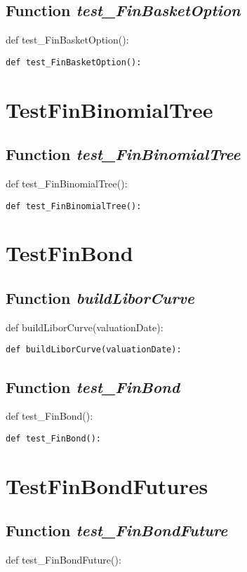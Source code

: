 \documentclass[twoside,11pt]{book}
\begin{document}
\subsection{Function {\it test\_FinBasketOption}}
def test\_FinBasketOption():

\begin{lstlisting}
def test_FinBasketOption():
\end{lstlisting}


\newpage
\section{TestFinBinomialTree}

\subsection{Function {\it test\_FinBinomialTree}}
def test\_FinBinomialTree():

\begin{lstlisting}
def test_FinBinomialTree():
\end{lstlisting}


\newpage
\section{TestFinBond}

\subsection{Function {\it buildLiborCurve}}
def buildLiborCurve(valuationDate):

\begin{lstlisting}
def buildLiborCurve(valuationDate):
\end{lstlisting}

\subsection{Function {\it test\_FinBond}}
def test\_FinBond():

\begin{lstlisting}
def test_FinBond():
\end{lstlisting}


\newpage
\section{TestFinBondFutures}

\subsection{Function {\it test\_FinBondFuture}}
def test\_FinBondFuture():
\end{document}
